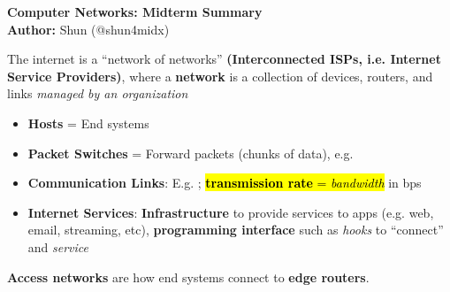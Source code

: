 \documentclass[12pt,a4paper]{article}
\begin{document}
\begin{center}
  {\Large \bf Computer Networks: Midterm Summary}\\[8pt]
  \textbf{Author:} Shun (@shun4midx)
\end{center}

\begin{tcolorbox}[colframe=green!60!blue, colback=green!20, title=\section*{Chapter 1 Summary}]
\end{tcolorbox}

\noindent The internet is a ``network of networks'' \textbf{(Interconnected ISPs, i.e. Internet Service Providers)}, where a \textbf{network} is a collection of devices, routers, and links \emph{managed by an organization}
\vspace{0.5em}\begin{itemize}
    \item \textbf{Hosts} = End systems
    \item \textbf{Packet Switches} = Forward packets (chunks of data), e.g. 
    \item \textbf{Communication Links}: E.g. ; \hl{\textbf{transmission rate} = \emph{bandwidth}} in bps
    \item \textbf{Internet Services}: \textbf{Infrastructure} to provide services to apps (e.g. web, email, streaming, etc), \textbf{programming interface} such as \emph{hooks} to ``connect'' and \emph{service}
\end{itemize}


\noindent \textbf{Access networks} are how end systems connect to \textbf{edge routers}. 
\end{document}

